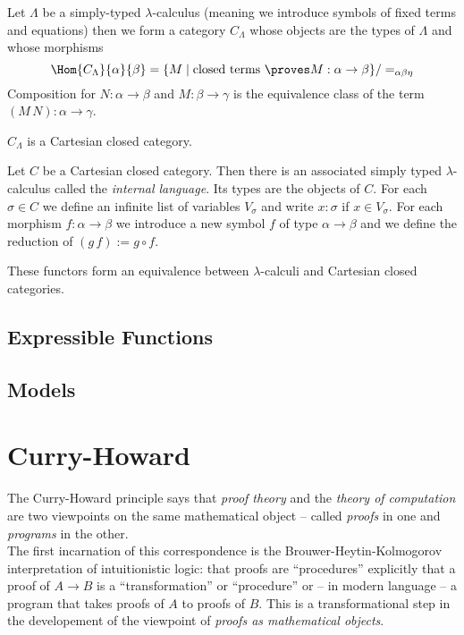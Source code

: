 \documentclass[12pt]{article}
\begin{document}
\begin{defn}
Let $\Lambda$ be a simply-typed $\lambda$-calculus (meaning we introduce symbols of fixed terms and equations) then we form a category $C_\Lambda$ whose objects are the types of $\Lambda$ and whose morphisms 
\[ \Hom{C_\Lambda}{\alpha}{\beta} = \{ M \mid \text{closed terms } \proves M : \alpha \to \beta \} / =_{\alpha \beta \eta} \]
Composition for $N : \alpha \to \beta$ and $M : \beta \to \gamma$ is the equivalence class of the term $(M \, N) : \alpha \to \gamma$. 
\end{defn}

\begin{prop}
$C_\Lambda$ is a Cartesian closed category. 
\end{prop}

\begin{defn}
Let $C$ be a Cartesian closed category. Then there is an associated simply typed $\lambda$-calculus called the \textit{internal language}. Its types are the objects of $C$. For each $\sigma \in C$ we define an infinite list of variables $V_\sigma$ and write $x : \sigma$ if $x \in V_\sigma$. For each morphism $f : \alpha \to \beta$ we introduce a new symbol $f$ of type $\alpha \to \beta$ and we define the reduction of $(g \, f) := g \circ f$.
\end{defn}

\begin{theorem}
These functors form an equivalence between $\lambda$-calculi and Cartesian closed categories. 
\end{theorem}

\subsection{Expressible Functions}

\subsection{Models}

\section{Curry-Howard}

The Curry-Howard principle says that \textit{proof theory} and the \textit{theory of computation} are two viewpoints on the same mathematical object -- called \textit{proofs} in one and \textit{programs} in the other.
\bigskip\\
The first incarnation of this correspondence is the Brouwer-Heytin-Kolmogorov interpretation of intuitionistic logic: that proofs are ``procedures'' explicitly that a proof of $A \to B$ is a ``transformation'' or ``procedure'' or -- in modern language -- a program that takes proofs of $A$ to proofs of $B$. This is a transformational step in the developement of the viewpoint of \textit{proofs as mathematical objects}. 
\end{document}
